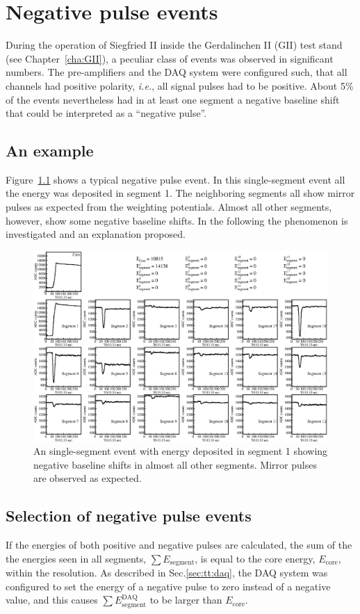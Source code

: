 \chapter{Negative pulse events}
\label{cha:np}
During the operation of Siegfried II inside the Gerdalinchen II (GII)
test stand (see Chapter~\ref{cha:GII}), a peculiar class of events was
observed in significant numbers. The pre-amplifiers and the DAQ system
were configured such, that all channels had positive polarity,
\textit{i.e.}, all signal pulses had to be positive. About 5\% of the
events nevertheless had in at least one segment a negative baseline
shift that could be interpreted as a ``negative pulse''.

\section{An example}
\label{sec:np:evt}
Figure~\ref{fig:np:npul} shows a typical negative pulse event. In this
single-segment event all the energy was deposited in segment 1. The
neighboring segments all show mirror pulses as expected from the
weighting potentials. Almost all other segments, however, show some
negative baseline shifts. In the following the phenomenon is
investigated and an explanation proposed.

\begin{figure}
\centering
\includegraphics{npul}
\caption{An single-segment event with energy deposited in segment 1
showing negative baseline shifts in almost all other segments. Mirror
pulses are observed as expected.}
\label{fig:np:npul}
\end{figure}


\section{Selection of negative pulse events}
\label{sec:np:sel}
If the energies of both positive and negative pulses are calculated,
the sum of the the energies seen in all segments, $\sum
E_{\text{segment}}$, is equal to the core energy, $E_{\text{core}}$,
within the resolution. As described in Sec.\ref{sec:tt:daq}, the DAQ
system was configured to set the energy of a negative pulse to zero
instead of a negative value, and this causes $\sum
E^{\text{DAQ}}_{\text{segment}}$ to be larger than $E_{\text{core}}$.

